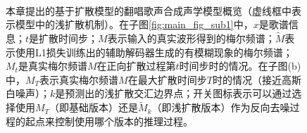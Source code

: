 \begin{figure}[ht]
    \centering
     \\
    \caption{本章提出的基于扩散模型的翻唱歌声合成声学模型概览（虚线框中表示模型中的浅扩散机制）。在子图\ref{fig:main_fig_sub1}中，$x$是歌谱信息；$t$是扩散时间步；$M$表示输入的真实波形得到的梅尔频谱；$\widetilde{M}$表示使用L1损失训练出的辅助解码器生成的有模糊现象的梅尔频谱；$M_t$是真实梅尔频谱$M$在正向扩散过程第$t$时间步时的情况。在子图(b)中，$M_T$表示真实梅尔频谱$M$在最大扩散时间步$T$时的情况（接近高斯白噪声）；$k$是预测出的浅扩散交汇边界点；开关图标表示可以通过选择使用$M_T$（即基础版本）还是$\widetilde{M}_k$（即浅扩散版本）作为反向去噪过程的起点来控制使用哪个版本的推理过程。}
    \label{fig:main_fig}
\end{figure}
